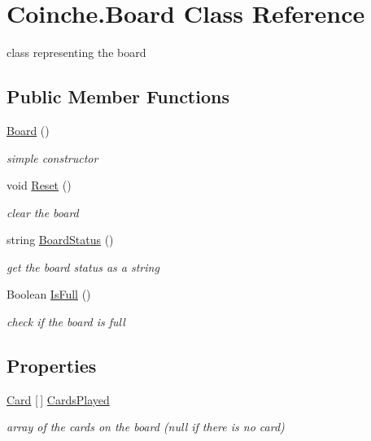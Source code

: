 \hypertarget{class_coinche_1_1_board}{}\section{Coinche.\+Board Class Reference}
\label{class_coinche_1_1_board}


class representing the board  


\subsection*{Public Member Functions}
\begin{DoxyCompactItemize}
\item 
\hyperlink{class_coinche_1_1_board_a62235716a2f4c7726973aca20cd46fce}{Board} ()
\begin{DoxyCompactList}\small\item\em simple constructor \end{DoxyCompactList}\item 
void \hyperlink{class_coinche_1_1_board_a5c17c44b33d20c90868cad3b504c4ae4}{Reset} ()
\begin{DoxyCompactList}\small\item\em clear the board \end{DoxyCompactList}\item 
string \hyperlink{class_coinche_1_1_board_ae95210444e9e18af75f0b55827842905}{Board\+Status} ()
\begin{DoxyCompactList}\small\item\em get the board status as a string \end{DoxyCompactList}\item 
Boolean \hyperlink{class_coinche_1_1_board_a9f83f16052be20631b1645edd53d8adb}{Is\+Full} ()
\begin{DoxyCompactList}\small\item\em check if the board is full \end{DoxyCompactList}\end{DoxyCompactItemize}
\subsection*{Properties}
\begin{DoxyCompactItemize}
\item 
\hyperlink{class_coinche_1_1_card}{Card} \mbox{[}$\,$\mbox{]} \hyperlink{class_coinche_1_1_board_a06fcff9cacac2e531c446007cece8751}{Cards\+Played}
\begin{DoxyCompactList}\small\item\em array of the cards on the board (null if there is no card) \end{DoxyCompactList}\end{DoxyCompactItemize}


